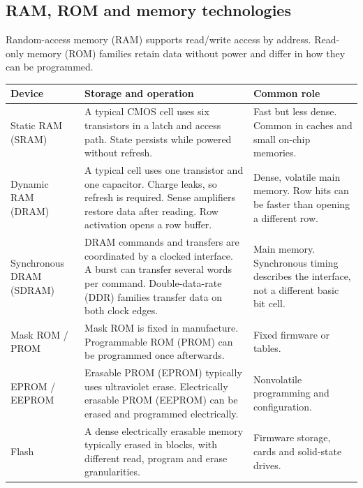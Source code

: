 \documentclass[12pt,a4paper]{article}
\begin{document}
\subsection{RAM, ROM and memory technologies}
Random-access memory (RAM) supports read/write access by address. Read-only memory (ROM) families retain data without power and differ in how they can be programmed.
\par\vspace{6pt}\noindent
\begin{tabularx}{\linewidth}{|B{3cm}|Y|Y|}\hline
Device & Storage and operation & Common role \\ \hline
Static RAM (SRAM) & A typical CMOS cell uses six transistors in a latch and access path. State persists while powered without refresh. & Fast but less dense. Common in caches and small on-chip memories. \\ \hline
Dynamic RAM (DRAM) & A typical cell uses one transistor and one capacitor. Charge leaks, so refresh is required. Sense amplifiers restore data after reading. Row activation opens a row buffer. & Dense, volatile main memory. Row hits can be faster than opening a different row. \\ \hline
Synchronous DRAM (SDRAM) & DRAM commands and transfers are coordinated by a clocked interface. A burst can transfer several words per command. Double-data-rate (DDR) families transfer data on both clock edges. & Main memory. Synchronous timing describes the interface, not a different basic bit cell. \\ \hline
Mask ROM / PROM & Mask ROM is fixed in manufacture. Programmable ROM (PROM) can be programmed once afterwards. & Fixed firmware or tables. \\ \hline
EPROM / EEPROM & Erasable PROM (EPROM) typically uses ultraviolet erase. Electrically erasable PROM (EEPROM) can be erased and programmed electrically. & Nonvolatile programming and configuration. \\ \hline
Flash & A dense electrically erasable memory typically erased in blocks, with different read, program and erase granularities. & Firmware storage, cards and solid-state drives. \\ \hline
\end{tabularx}
\end{document}
